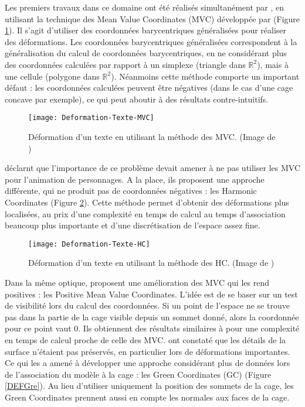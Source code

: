 Les premiers travaux dans ce domaine ont été réalisés simultanément par
\cite{JSW05} \cite{FKR05}, en utilisant la technique des Mean Value
Coordinates (MVC) développée par \cite{Flo03} (Figure \ref{DEFMea}). Il s'agit
d'utiliser des coordonnées barycentriques généralisées pour réaliser des
déformations. Les coordonnées barycentriques généralisées correspondent à la
généralisation du calcul de coordonnées barycentriques, en ne considérant plus
des coordonnées calculées par rapport à un simplexe (triangle dans
$\mathbb{R}^2$), mais à une cellule (polygone dans $\mathbb{R}^2$). Néanmoins
cette méthode comporte un important défaut : les coordonnées calculées peuvent
être négatives (dans le cas d'une cage concave par exemple), ce qui peut
aboutir à des résultats contre-intuitifs.

\begin{figure}[!ht]
\texttt{[image: Deformation-Texte-MVC]}

\caption[Déformation d'un texte (MVC)] {Déformation d'un texte en utilisant la
méthode des MVC. (Image de \cite{LLC08})}

\label{DEFMea}
\end{figure}

\cite{JMDGS07} déclarnt que l'importance de ce problème devait amener à ne pas
utiliser les MVC pour l'animation de personnages. A la place, ils proposent
une approche différente, qui ne produit pas de coordonnées négatives : les
Harmonic Coordinates (Figure \ref{DEFHar}). Cette méthode permet d'obtenir
des déformations plus localisées, au prix d'une complexité en temps de calcul
au temps d'association beaucoup plus importante et d'une discrétisation de
l'espace assez fine.

\begin{figure}[!ht]
\texttt{[image: Deformation-Texte-HC]}

\caption[Déformation d'un texte (HC)] {Déformation d'un texte en utilisant la
méthode des HC. (Image de \cite{LLC08})}

\label{DEFHar}
\end{figure}

Dans la même optique, \cite{LKCL07} proposent une amélioration des MVC qui les
rend positives : les Positive Mean Value Coordinates. L'idée est de se baser
sur un test de visibilité lors du calcul des coordonnées. Si un point de
l'espace ne se trouve pas dans la partie de la cage visible depuis un sommet
donné, alors la coordonnée pour ce point vaut 0. Ils obtiennent des résultats
similaires à \cite{JMDGS07} pour une complexité en temps de calcul proche de
celle des MVC. \cite{LLC08} ont constaté que les détails de la surface
n'étaient pas préservés, en particulier lors de déformations importantes. Ce
qui les a amené à développer une approche considérant plus de données lors de
l'association du modèle à la cage : les Green Coordinates (GC) (Figure
\ref{DEFGre}). Au lieu d'utiliser uniquement la position des sommets de la
cage, les Green Coordinates prennent aussi en compte les normales aux faces de
la cage.

